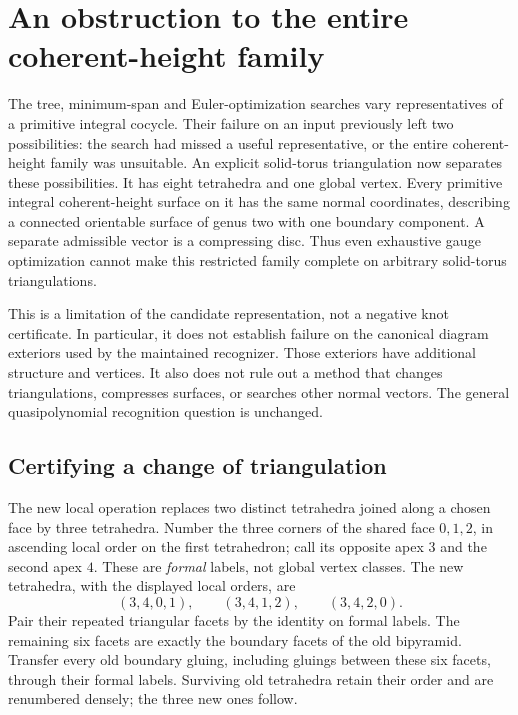 \section{An obstruction to the entire coherent-height family}
\label{sec:coherent-obstruction}

The tree, minimum-span and Euler-optimization searches vary representatives
of a primitive integral cocycle. Their failure on an input previously left
two possibilities: the search had missed a useful representative, or the
entire coherent-height family was unsuitable. An explicit solid-torus
triangulation now separates these possibilities. It has eight tetrahedra and
one global vertex. Every primitive integral coherent-height surface on it
has the same normal coordinates, describing a connected orientable surface
of genus two with one boundary component. A separate admissible vector is
a compressing disc. Thus even exhaustive gauge optimization cannot make
this restricted family complete on arbitrary solid-torus triangulations.

This is a limitation of the candidate representation, not a negative knot
certificate. In particular, it does not establish failure on the canonical
diagram exteriors used by the maintained recognizer. Those exteriors have
additional structure and vertices. It also does not rule out a method that
changes triangulations, compresses surfaces, or searches other normal vectors.
The general quasipolynomial recognition question is unchanged.

\subsection{Certifying a change of triangulation}

The new local operation  replaces two distinct tetrahedra
joined along a chosen face by three tetrahedra. Number the three corners of
the shared face $0,1,2$, in ascending local order on the first tetrahedron;
call its opposite apex $3$ and the second apex $4$. These are \emph{formal}
labels, not global vertex classes. The new tetrahedra, with the displayed
local orders, are
\[
 (3,4,0,1),\qquad (3,4,1,2),\qquad (3,4,2,0).
\]
Pair their repeated triangular facets by the identity on formal labels.
The remaining six facets are exactly the boundary facets of the old
bipyramid. Transfer every old boundary gluing, including gluings between
these six facets, through their formal labels. Surviving old tetrahedra
retain their order and are renumbered densely; the three new ones follow.


